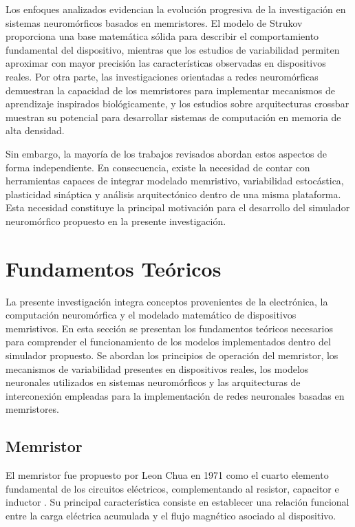 Los enfoques analizados evidencian la evolución progresiva de la investigación en sistemas neuromórficos basados en memristores. El modelo de Strukov proporciona una base matemática sólida para describir el comportamiento fundamental del dispositivo, mientras que los estudios de variabilidad permiten aproximar con mayor precisión las características observadas en dispositivos reales. Por otra parte, las investigaciones orientadas a redes neuromórficas demuestran la capacidad de los memristores para implementar mecanismos de aprendizaje inspirados biológicamente, y los estudios sobre arquitecturas crossbar muestran su potencial para desarrollar sistemas de computación en memoria de alta densidad.

Sin embargo, la mayoría de los trabajos revisados abordan estos aspectos de forma independiente. En consecuencia, existe la necesidad de contar con herramientas capaces de integrar modelado memristivo, variabilidad estocástica, plasticidad sináptica y análisis arquitectónico dentro de una misma plataforma. Esta necesidad constituye la principal motivación para el desarrollo del simulador neuromórfico propuesto en la presente investigación.

\section{Fundamentos Teóricos}

La presente investigación integra conceptos provenientes de la electrónica, la computación neuromórfica y el modelado matemático de dispositivos memristivos. En esta sección se presentan los fundamentos teóricos necesarios para comprender el funcionamiento de los modelos implementados dentro del simulador propuesto. Se abordan los principios de operación del memristor, los mecanismos de variabilidad presentes en dispositivos reales, los modelos neuronales utilizados en sistemas neuromórficos y las arquitecturas de interconexión empleadas para la implementación de redes neuronales basadas en memristores.

\subsection{Memristor}

El memristor fue propuesto por Leon Chua en 1971 como el cuarto elemento fundamental de los circuitos eléctricos, complementando al resistor, capacitor e inductor \cite{17}. Su principal característica consiste en establecer una relación funcional entre la carga eléctrica acumulada y el flujo magnético asociado al dispositivo.

